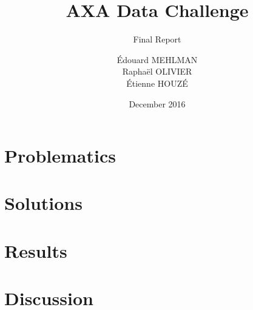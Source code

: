 \documentclass[a4paper,10pt]{article}
\title{AXA Data Challenge}
\subtitle{Final Report}
\author{Édouard MEHLMAN\\
      Raphaël OLIVIER\\
      Étienne HOUZÉ}
\date{December 2016}
\begin{document}
\maketitle
\section{Problematics}

\section{Solutions}

\section{Results}

\section{Discussion}
\end{document}
